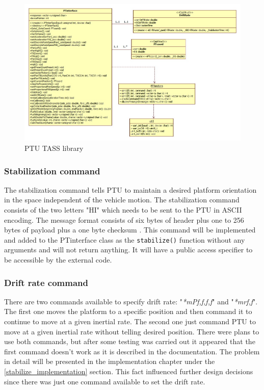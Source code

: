 \begin{figure}[H]
\centering
\centerline{\includegraphics[scale=0.53]{./images/PTinterface}}
\caption{PTU TASS library}
\label{fig:PTinterface}
\end{figure}

\subsubsection{Stabilization command}
The stabilization command tells PTU to maintain a desired platform orientation in the space independent of the vehicle motion. The stabilization command consists of the two letters "HI" which needs to be sent to the PTU in ASCII encoding. The message format consists of six bytes of header plus one to 256 bytes of payload plus a one byte checksum \cite{PTUCommandSetDocumentation}. This command will be implemented and added to the PTinterface class as the \texttt{stabilize()} function without any arguments and will not return anything. It will have a public access specifier to be accessible by the external code. 
\subsubsection{Drift rate command}
There are two commands available to specify drift rate: "\textit{*mPf,f,f,f}" and "\textit{*mrf,f}". The first one moves the platform to a specific position and then command it to continue to move at a given inertial rate. The second one just command PTU to move at a given inertial rate without telling desired position. There were plans to use both commands, but after some testing was carried out it appeared that the first command doesn't work as it is described in the documentation. The problem in detail will be presented in the implementation chapter under the \ref{stabilize_implementation} section. This fact influenced further design decisions since there was just one command available to set the drift rate. 

